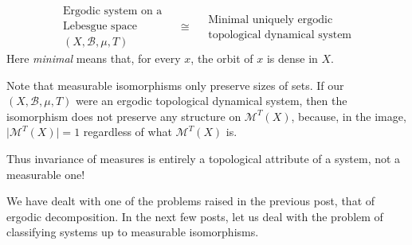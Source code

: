 \documentclass[11pt,a4paper]{article}
\begin{document}
\setcounter{theorem}{25}\begin{theorem}
\[
  \begin{gathered}
    \text{Ergodic system on a}\\
    \text{Lebesgue space}\\
    (X,\mathcal B,\mu,T)
  \end{gathered}
  \quad\cong\quad
  \begin{gathered}
    \text{Minimal uniquely ergodic}\\
    \text{topological dynamical system}
  \end{gathered}
\]
Here \emph{minimal} means that, for every $x$, the orbit of $x$ is dense in $X$.
\end{theorem}

Note that measurable isomorphisms only preserve sizes of sets. If
our $(X,\mathcal B,\mu,T)$ were an ergodic topological dynamical system,
then the isomorphism does not preserve any structure on $\mathcal M^T(X)$,
because, in the image, $\lvert\mathcal M^T(X)\rvert=1$ regardless of what
$\mathcal M^T(X)$ is.

Thus invariance of measures is entirely a topological attribute of a system,
not a measurable one!

We have dealt with one of the problems raised in the previous post, that of
ergodic decomposition. In the next few posts, let us deal with the problem of
classifying systems up to measurable isomorphisms.
\end{document}
